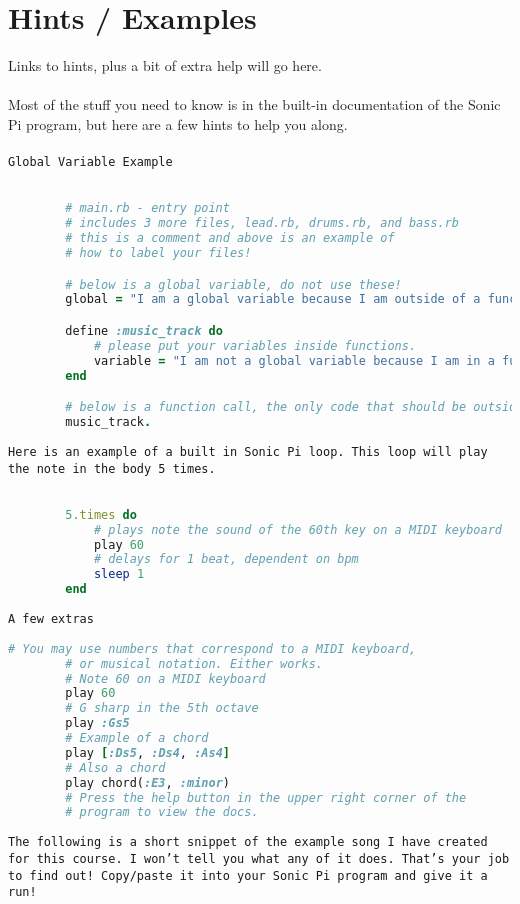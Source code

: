 \documentclass{42-en}
\begin{document}
\chapter{Hints / Examples}
	Links to hints, plus a bit of extra help will go here.\\\\
	Most of the stuff you need to know is in the built-in documentation of the Sonic Pi program, but here are a few hints to help you along.\\\\
	\texttt{Global Variable Example}
	\begin{lstlisting}[language=Ruby]

		# main.rb - entry point
		# includes 3 more files, lead.rb, drums.rb, and bass.rb
		# this is a comment and above is an example of
		# how to label your files!

		# below is a global variable, do not use these!
		global = "I am a global variable because I am outside of a function"

		define :music_track do
			# please put your variables inside functions.
			variable = "I am not a global variable because I am in a function!"
		end

		# below is a function call, the only code that should be outside of functions!
		music_track.

	\end{lstlisting}
	\newpage
	\texttt{Here is an example of a built in Sonic Pi loop. This loop will play the note in the body 5 times.}\\
	\begin{lstlisting}[language=Ruby]

		5.times do
			# plays note the sound of the 60th key on a MIDI keyboard
			play 60
			# delays for 1 beat, dependent on bpm
			sleep 1
		end

	\end{lstlisting}
	\texttt{A few extras}
	\begin{lstlisting}[language=Ruby]
		# You may use numbers that correspond to a MIDI keyboard, 
		# or musical notation. Either works.
		# Note 60 on a MIDI keyboard
		play 60
		# G sharp in the 5th octave
		play :Gs5
		# Example of a chord
		play [:Ds5, :Ds4, :As4]
		# Also a chord
		play chord(:E3, :minor) 
		# Press the help button in the upper right corner of the 
		# program to view the docs.
	\end{lstlisting}
	\newpage
	\texttt{The following is a short snippet of the example song I have created for this course. I won't tell you what any of it does. That's your job to find out! Copy/paste it into your Sonic Pi program and give it a run!}
\end{document}
